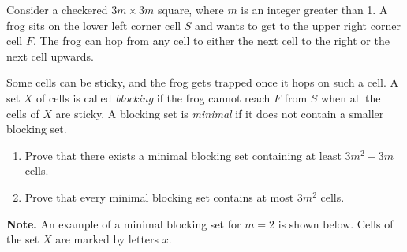 Consider a checkered $3m \times 3m$ square, where $m$ is an integer greater than 1. A frog sits on the lower left corner cell $S$ and wants to get to the upper right corner cell $F$. The frog can hop from any cell to either the next cell to the right or the next cell upwards.

Some cells can be sticky, and the frog gets trapped once it hops on such a cell. A set $X$ of cells is called \emph{blocking} if the frog cannot reach $F$ from $S$ when all the cells of $X$ are sticky. A blocking set is \emph{minimal} if it does not contain a smaller blocking set.

\begin{enumerate}
\item[(a)] Prove that there exists a minimal blocking set containing at least $3m^2 - 3m$ cells.
\item[(b)] Prove that every minimal blocking set contains at most $3m^2$ cells.
\end{enumerate}

\textbf{Note.} An example of a minimal blocking set for $m = 2$ is shown below. Cells of the set $X$ are marked by letters $x$.
